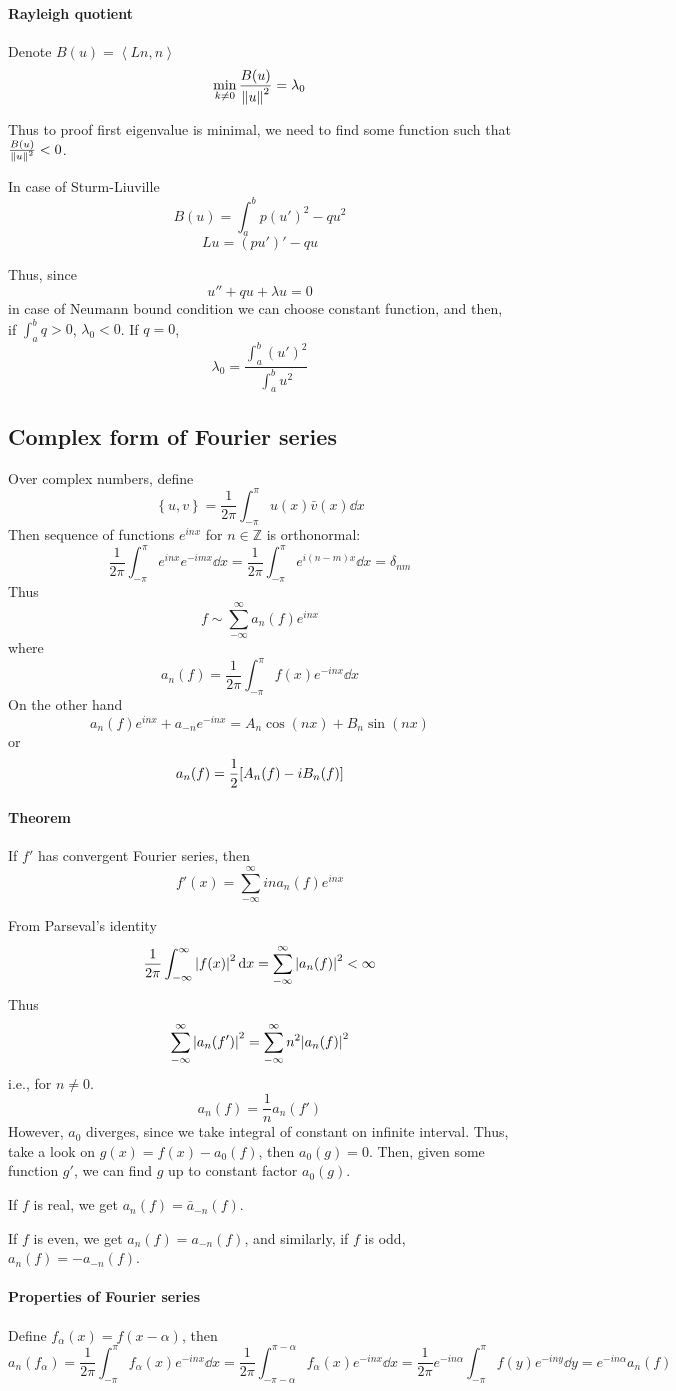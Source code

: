 \paragraph{Rayleigh quotient} %
Denote $B(u) = \left\langle Ln,n\right\rangle$
$$\min_{k\neq 0} \frac{B(u)}{\norm{u}^2} = \lambda_0$$

Thus to proof first eigenvalue is minimal, we need to find some function such that $\frac{B(u)}{\norm{u}^2} <0$.

In case of Sturm-Liuville 
$$B(u) = \int_a^b p(u')^2 - qu^2$$
$$Lu = (pu')' - qu$$

Thus, since
$$u'' + qu + \lambda u = 0$$
in case of Neumann bound condition we can choose constant function, and then, if $\int_a^b q >0$, $\lambda_0 < 0 $.
If $q=0$,
$$\lambda_0 = \frac{\int_a^b (u')^2}{\int_a^b u^2}$$
\subsection{Complex form of Fourier series}
Over complex numbers, define
$$\left\lbrace u,v \right\rbrace = \frac{1}{2\pi} \int_{-\pi}^{\pi} u(x) \bar{v}(x) \dd{x} $$
Then sequence of functions $e^{inx}$ for $n\in \mathbb{Z}$ is orthonormal:
$$\frac{1}{2\pi} \int_{-\pi}^{\pi} e^{inx} e^{-imx} \dd{x} = \frac{1}{2\pi} \int_{-\pi}^\pi e^{i(n-m)x} \dd{x} = \delta_{nm}$$
Thus
$$f \sim \sum_{-\infty}^{\infty} a_n(f) e^{inx} $$
where
$$a_n(f) = \frac{1}{2\pi} \int_{-\pi}^\pi f(x) e^{-inx} \dd{x}$$
On the other hand
$$a_n(f)e^{inx} +a_{-n}e^{-inx}  = A_n \cos(nx) + B_n\sin(nx)$$
or
$$ a_n(f) =   \frac{1}{2} \qty[A_n(f) - i B_n(f)]$$
\paragraph{Theorem}
If $f'$ has convergent Fourier series, then
$$f'(x) = \sum_{-\infty}^\infty ina_n(f) e^{inx}$$

From Parseval's identity
$$\frac{1}{2\pi } \int_{-\infty}^\infty \abs{f(x)}^2 \dd{x} = \sum_{-\infty}^\infty \abs{a_n(f)}^2 < \infty $$
Thus
$$ \sum_{-\infty}^\infty \abs{a_n(f')}^2 = \sum_{-\infty}^\infty n^2\abs{a_n(f)}^2 $$
i.e., for $n\neq 0$.
$$a_n(f) = \frac{1}{n}a_n(f')$$
However, $a_0$ diverges, since we take integral of constant on infinite interval. Thus, take a look on $g(x) = f(x) -a_0(f)$, then $a_0(g) = 0$. Then, given some function $g'$, we can find $g$ up to constant factor $a_0(g)$.

If $f$ is real, we get $a_n(f) = \bar{a}_{-n}(f)$.

If $f$ is even, we get $a_n(f) = a_{-n}(f)$, and similarly, if $f$ is odd, $a_n(f) = -a_{-n}(f)$.

\paragraph{Properties of Fourier series}
Define $f_\alpha(x) = f(x-\alpha)$, then
$$a_n(f_\alpha) = \frac{1}{2\pi} \int_{-\pi}^\pi f_\alpha(x) e^{-inx} \dd{x}= \frac{1}{2\pi} \int_{-\pi-\alpha}^{\pi-\alpha} f_\alpha(x) e^{-inx} \dd{x} = \frac{1}{2\pi}  e^{-in\alpha}\int_{-\pi}^{\pi}f(y) e^{-iny} \dd{y} =  e^{-in\alpha}a_n(f) $$